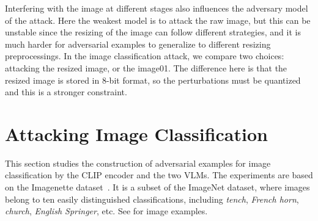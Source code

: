 \documentclass{article}
\begin{document}
Interfering with the image at different stages also influences the adversary model of the attack. Here the weakest model is to attack the raw image, but this can be unstable since the resizing of the image can follow different strategies, and it is much harder for adversarial examples to generalize to different resizing preprocessings. In the image classification attack, we compare two choices: attacking the resized image, or the image01. The difference here is that the resized image is stored in 8-bit format, so the perturbations must be quantized and this is a stronger constraint.


\section{Attacking Image Classification}

This section studies the construction of adversarial examples for image classification by the CLIP encoder and the two VLMs.
The experiments are based on the Imagenette dataset~\cite{Howard2019Imagenette}. It is a subset of the ImageNet dataset, where images belong to ten easily distinguished classifications, including \textit{tench}, \textit{French horn}, \textit{church}, \textit{English Springer}, etc. See  for image examples.
\end{document}
